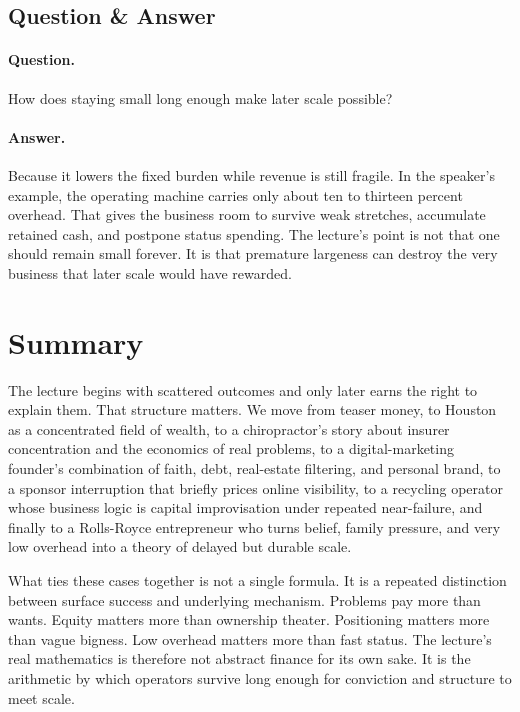 \subsection{Question \& Answer}

\paragraph{Question.} How does staying small long enough make later scale possible?

\paragraph{Answer.} Because it lowers the fixed burden while revenue is still fragile. In the speaker's example, the operating machine carries only about ten to thirteen percent overhead. That gives the business room to survive weak stretches, accumulate retained cash, and postpone status spending. The lecture's point is not that one should remain small forever. It is that premature largeness can destroy the very business that later scale would have rewarded.

\section{Summary}

The lecture begins with scattered outcomes and only later earns the right to explain them. That structure matters. We move from teaser money, to Houston as a concentrated field of wealth, to a chiropractor's story about insurer concentration and the economics of real problems, to a digital-marketing founder's combination of faith, debt, real-estate filtering, and personal brand, to a sponsor interruption that briefly prices online visibility, to a recycling operator whose business logic is capital improvisation under repeated near-failure, and finally to a Rolls-Royce entrepreneur who turns belief, family pressure, and very low overhead into a theory of delayed but durable scale.

What ties these cases together is not a single formula. It is a repeated distinction between surface success and underlying mechanism. Problems pay more than wants. Equity matters more than ownership theater. Positioning matters more than vague bigness. Low overhead matters more than fast status. The lecture's real mathematics is therefore not abstract finance for its own sake. It is the arithmetic by which operators survive long enough for conviction and structure to meet scale.